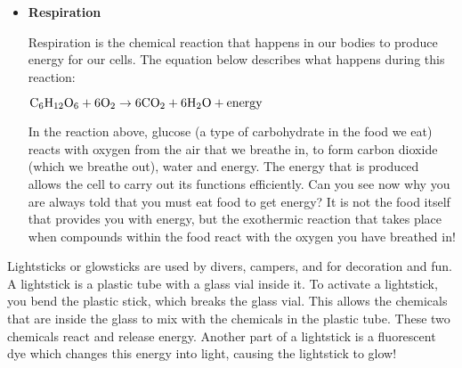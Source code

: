 \begin{enumerate}
{\begin{itemize}
\begin{center}
$\rm{Fuel + Oxygen \rightarrow Heat + Water + Carbon ~Dioxide}$

$\rm{CH_{4} + 2O_{2} \rightarrow Heat + 2H_{2}O + CO_{2}}$
\end{center}

This is why we burn fuels for energy, because the chemical changes that take place during the reaction release huge amounts of energy, which we then use for things like power and electricity. You should also note that \textit{carbon dioxide} is produced during this reaction. Later we will discuss some of the negative impacts of $CO_{2}$ on the environment. The chemical reaction that takes place when fuels burn therefore has both positive and negative consequences.\\

\item{\textbf{Respiration}}

Respiration is the chemical reaction that happens in our bodies to produce energy for our cells. The equation below describes what happens during this reaction:

\begin{center}
$\rm{C_{6}H_{12}O_{6} + 6O_{2} \rightarrow 6CO_{2} + 6H_{2}O + energy}$
\end{center}

In the reaction above, glucose (a type of carbohydrate in the food we eat) reacts with oxygen from the air that we breathe in, to form carbon dioxide (which we breathe out), water and energy. The energy that is produced allows the cell to carry out its functions efficiently. Can you see now why you are always told that you must eat food to get energy? It is not the food itself that provides you with energy, but the exothermic reaction that takes place when compounds within the food react with the oxygen you have breathed in!
\end{itemize}
}
\end{enumerate}

\begin{IFact}{
Lightsticks or glowsticks are used by divers, campers, and for decoration and fun. A lightstick is a plastic tube with a glass vial inside it. To activate a lightstick, you bend the plastic stick, which breaks the glass vial. This allows the chemicals that are inside the glass to mix with the chemicals in the plastic tube. These two chemicals react and release energy. Another part of a lightstick is a fluorescent dye which changes this energy into light, causing the lightstick to glow!
}
\end{IFact}

